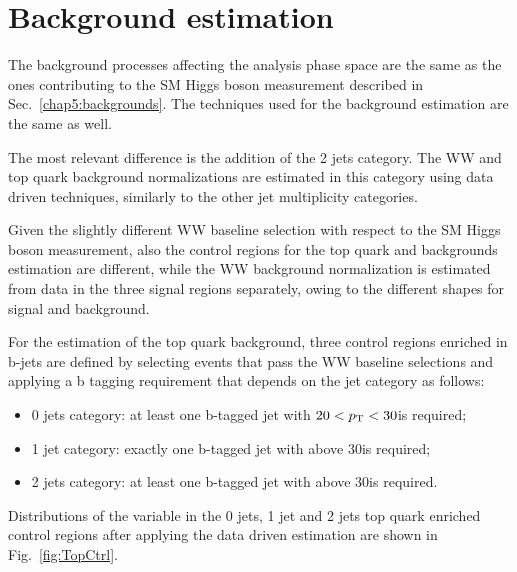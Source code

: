 \section{Background estimation}\label{chap6:Backgrounds}

The background processes affecting the analysis phase space are the same as the ones contributing to the SM Higgs boson measurement described in Sec.~\ref{chap5:backgrounds}. The techniques used for the background estimation are the same as well.

The most relevant difference is the addition of the 2 jets category. The WW and top quark background normalizations are estimated in this category using data driven techniques, similarly to the other jet multiplicity categories.

Given the slightly different WW baseline selection with respect to the SM Higgs boson measurement, also the control regions for the top quark and \dytt backgrounds estimation are different, while the WW background normalization is estimated from data in the three signal regions separately, owing to the different \mti shapes for signal and background.

For the estimation of the top quark background, three control regions enriched in b-jets are defined by selecting events that pass the WW baseline selections and applying a b tagging requirement that depends on the jet category as follows:
\begin{itemize}
\item 0 jets category: at least one b-tagged jet with $20 < p_\mathrm{T} < 30$\GeV is required;
\item 1 jet category: exactly one b-tagged jet with \pt above 30\GeV is required;
\item 2 jets category: at least one b-tagged jet with \pt above 30\GeV is required.
\end{itemize}
Distributions of the \mti variable in the 0 jets, 1 jet and 2 jets top quark enriched control regions after applying the data driven estimation are shown in Fig.~\ref{fig:TopCtrl}.

